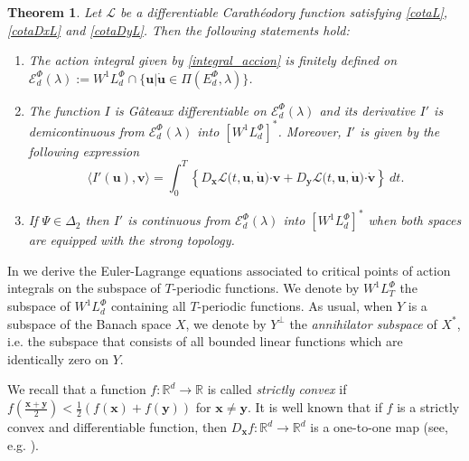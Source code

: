 \documentclass[twoside]{article}
\newtheorem{thm}{Theorem}[section]
\theoremstyle{remark}
\newcommand{\lphi}{L^{\Phi}}
\newcommand{\ephi}{E^{\Phi}}
\newcommand{\wphi}{W^{1}\lphi}
\newcommand{\domi}{\mathcal{E}^{\Phi}_d(\lambda)}
\renewcommand{\b}[1]{\boldsymbol{#1}}
\newcommand{\ccdot}{\b{\cdot}}
\begin{document}
\begin{thm}\label{teorema_acotacion}
Let $\mathcal{L}$ be a differentiable Carath\'eodory function satisfying \eqref{cotaL}, \eqref{cotaDxL} and \eqref{cotaDyL}. 
Then the following statements hold:
\begin{enumerate}
\item \label{T1item1} \label{A1} The action integral given by \eqref{integral_accion}
is finitely defined on $\domi:=W^{1}\lphi_d\cap\{\b{u}|\b{\dot{u}}\in\Pi(\ephi_d,\lambda)\}$.

\item\label{T1item3} The function  $I$ is G\^ateaux differentiable on $\domi$ and  its derivative $I'$ is demicontinuous from $\domi$  into $\left[\wphi_d \right]^*$. Moreover, $I'$ is given by the following expression
\begin{equation}\label{DerAccion}
\langle  I'(\b{u}),\b{v}\rangle= \int_0^T \left\{D_{\b{x}}\mathcal{L}\big(t,\b{u},\b{\dot{u}}\big)\ccdot \b{v}+ D_{\b{y}}\mathcal{L}\big(t,\b{u},\b{\dot{u}}\big)\ccdot\b{\dot{v}}\right\} \ dt.
\end{equation}

\item\label{T1item4}  If  $\Psi \in \Delta_2$ then 
  $I'$ is continuous from $\domi$ into $\left[\wphi_d\right]^*$ when both spaces are equipped with the strong topology.
\end{enumerate}
\end{thm}





In \cite{ABGMS2015} we derive the Euler-Lagrange equations associated to critical points of action integrals on the subspace of $T$-periodic functions.  
We denote by $\wphi_T$ the subspace of $\wphi_d$ containing all  $T$-periodic functions. As usual, when $Y$ is a subspace of
the Banach space $X$, we denote by $Y^{\perp}$ the \emph{annihilator subspace} of $X^*$, i.e. the subspace
that consists of all  bounded linear functions which are identically zero on $Y$.

We recall that  a function $f: \mathbb{R}^d \to \mathbb{R}$ is called \emph{strictly convex} if 
$f\left(\tfrac{\b{x}+\b{y}}{2}\right)< \tfrac{1}{2} \left(f\left(
\b{x}\right)+f\left( \b{y}\right)\right)$ for  $\b{x}\neq\b{y}$.  
It is  well known that if $f$ is a strictly convex and differentiable function, then
$D_{\b{x}}f:\mathbb{R}^d\to\mathbb{R}^d$ is a one-to-one map  (see, e.g. \cite[Thm. 12.17]{rockafellar2009variational}).
\end{document}
